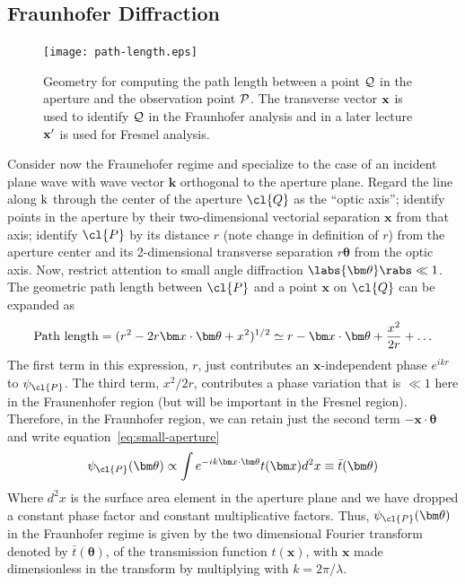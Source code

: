 \subsection{Fraunhofer Diffraction}

\begin{figure}[th!]
	\centering
	\texttt{[image: path-length.eps]}
  \caption{Geometry for computing the path length between a point $\cal{Q}$ in 
the aperture and the observation point $\cal{P}$. The transverse vector 
$\bf{x}$ is used to identify $\cal{Q}$ in the Fraunhofer analysis and in a
later lecture $\bf{x'}$ is used for Fresnel analysis.}
  \label{fig:path-length}
\end{figure}

Consider now the Fraunehofer regime and specialize to the case of an incident plane wave with
 wave vector ${\bm k}$ orthogonal to the aperture plane. Regard the line along ${\rm k}$ through
the center of the aperture $\cl{Q}$ as the ``optic axis''; identify points in the aperture by
their two-dimensional vectorial separation ${\bm x}$ from that axis; identify $\cl{P}$ by 
its distance $r$  (note change in definition of $r$) 
from the aperture center and its 2-dimensional transverse separation 
$r{\bm\theta}$ from the optic axis. Now, restrict attention to small angle diffraction
$\labs{\bm\theta}\rabs\ll 1$. The geometric path length between $\cl{P}$ and a point ${\bm x}$ on 
$\cl{Q}$ can be expanded as
\[
{\rm Path~length}=(r^2-2r{\bm x}\cdot{\bm\theta}+x^2)^{1/2}
       \simeq r-{\bm x}\cdot{\bm\theta}+{x^2\over 2r}+\ldots
\]
The first term in this expression, $r$, just contributes an ${\bm x}$-independent phase
$e^{ikr}$ to $\psi_\cl{P}$. The third term, ${x^2/2r}$, contributes a phase variation that is
$\ll 1$ here in the Fraunenhofer region (but will be important in the Fresnel region). Therefore, 
in the Fraunhofer region, we can retain just the second term $-{\bm x}\cdot{\bm\theta}$ and
write equation~\ref{eq:small-aperture} 
\[
\psi_\cl{P}({\bm\theta})\propto\int e^{-ik{\bm x}\cdot{\bm\theta}}t({\bm x})d^2x
     \equiv\bar{t}({\bm\theta})
\]
Where $d^2x$ is the surface area element in the aperture plane and we have dropped a constant
phase factor and constant multiplicative factors. Thus, $\psi_\cl{P}({\bm\theta})$ in the 
Fraunhofer regime is given by the two dimensional Fourier transform denoted by 
$\bar{t}({\bm\theta})$, of the transmission function $t({\bm x})$, with ${\bm x}$ made 
dimensionless in the transform by multiplying with $k={2\pi/\lambda}$. 

